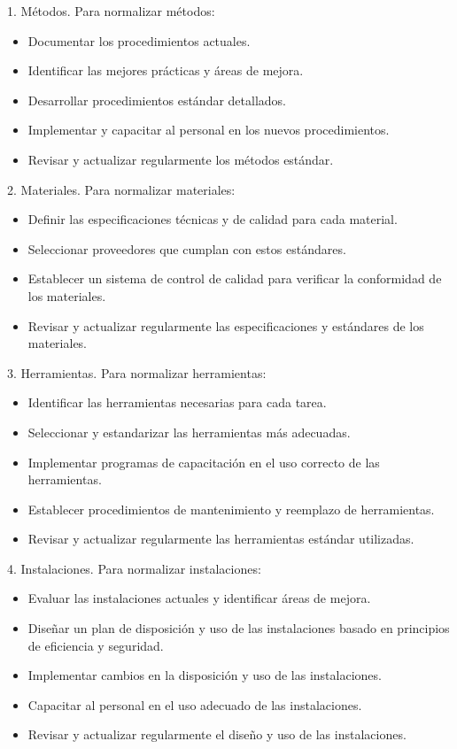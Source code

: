     1. Métodos. Para normalizar métodos: 
    \begin{itemize}
    \item Documentar los procedimientos actuales.
    \item Identificar las mejores prácticas y áreas de mejora.
    \item Desarrollar procedimientos estándar detallados.
    \item Implementar y capacitar al personal en los nuevos procedimientos.
    \item Revisar y actualizar regularmente los métodos estándar.
    \end{itemize} 
    2. Materiales. Para normalizar materiales: 
    \begin{itemize}
    \item Definir las especificaciones técnicas y de calidad para cada material.
    \item Seleccionar proveedores que cumplan con estos estándares.
    \item Establecer un sistema de control de calidad para verificar la conformidad de los materiales.
    \item Revisar y actualizar regularmente las especificaciones y estándares de los materiales.
    \end{itemize} 
    3. Herramientas. Para normalizar herramientas: 
    \begin{itemize}
    \item Identificar las herramientas necesarias para cada tarea.
    \item Seleccionar y estandarizar las herramientas más adecuadas.
    \item Implementar programas de capacitación en el uso correcto de las herramientas.
    \item Establecer procedimientos de mantenimiento y reemplazo de herramientas.
    \item Revisar y actualizar regularmente las herramientas estándar utilizadas.
    \end{itemize} 
    4. Instalaciones. Para normalizar instalaciones: 
    \begin{itemize}
    \item Evaluar las instalaciones actuales y identificar áreas de mejora.
    \item Diseñar un plan de disposición y uso de las instalaciones basado en principios de eficiencia y seguridad.
    \item Implementar cambios en la disposición y uso de las instalaciones.
    \item Capacitar al personal en el uso adecuado de las instalaciones.
    \item Revisar y actualizar regularmente el diseño y uso de las instalaciones.
    \end{itemize} 
